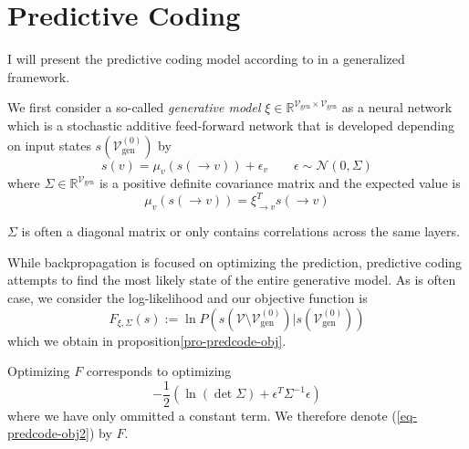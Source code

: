 \documentclass[a4paper,11pt]{article}
\begin{document}
\section{Predictive Coding}
I will present the predictive coding model according to \cite{Whittington2017} in a generalized framework.
\begin{Abs}
We first consider a so-called \emph{generative model} $\xi\in\mathbb{R}^{\mathcal{V}_{\text{gen}}\times\mathcal{V}_{\text{gen}}}$ as a neural network which is a stochastic additive feed-forward network that is developed depending on input states $s(\mathcal{V}^{(0)}_{\text{gen}})$ by
\begin{equation}
s(v)=\mu_v\left(s(\to v)\right)+\epsilon_v\qquad \epsilon\sim\mathcal{N}(0,\Sigma)
\end{equation}
where $\Sigma\in\mathbb{R}^{\mathcal{V}_{\text{gen}}}$ is a positive definite covariance matrix and the expected value is
\begin{equation}
\mu_v\left(s(\to v)\right)=\xi_{\to v}^Ts(\to v)
\end{equation}
\end{Abs}
\begin{Bem}
$\Sigma$ is often a diagonal matrix or only contains correlations across the same layers.
\end{Bem}
\begin{Abs}
While backpropagation is focused on optimizing the prediction, predictive coding attempts to find the most likely state of the entire generative model. As is often case, we consider the log-likelihood and our objective function is
\begin{equation}
F_{\xi,\Sigma}(s):=\ln P\left(s\left(\mathcal{V}\setminus\mathcal{V}^{(0)}_{\text{gen}}\right)|s\left(\mathcal{V}^{(0)}_{\text{gen}}\right)\right)
\end{equation}
which we obtain in proposition\ref{pro-predcode-obj}.
\end{Abs}
\begin{Pro}\label{pro-predcode-obj}
Optimizing $F$ corresponds to optimizing
\begin{equation}\label{eq-predcode-obj2}
-\frac{1}{2}\left(\ln\left(\det\Sigma\right)+\epsilon^T\Sigma^{-1}\epsilon\right)
\end{equation}
where we have only ommitted a constant term. We therefore denote (\ref{eq-predcode-obj2}) by $F$.
\end{Pro}
\end{document}

